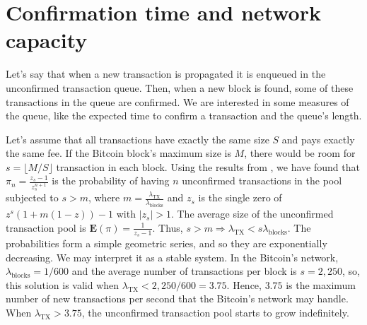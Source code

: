 


\section{Confirmation time and network capacity}

Let's say that when a new transaction is propagated it is enqueued in the unconfirmed transaction queue. Then, when a new block is found, some of these transactions in the queue are confirmed. We are interested in some measures of the queue, like the expected time to confirm a transaction and the queue's length.

Let's assume that all transactions have exactly the same size $S$ and pays exactly the same fee. If the Bitcoin block's maximum size is $M$, there would be room for $s = \lfloor M/S \rfloor$ transaction in each block. Using the results from \citet{bailey1954queueing}, we have found that $\pi_n = \frac{z_s-1}{z_s^{n+1}}$ is the probability of having $n$ unconfirmed transactions in the pool subjected to $s > m$, where $m=\frac{\lambda_{\text{TX}}}{\lambda_{\text{blocks}}}$ and $z_s$ is the single zero of $z^s(1+m(1-z))-1$ with $|z_s|>1$. The average size of the unconfirmed transaction pool is $\mathbf{E}(\pi) = \frac{1}{z_s - 1}$. Thus, $s > m \Rightarrow \lambda_{\text{TX}} < s \lambda_{\text{blocks}}$. The probabilities form a simple geometric series, and so they are exponentially decreasing. We may interpret it as a stable system. In the Bitcoin's network, $\lambda_{\text{blocks}} = 1/600$ and the average number of transactions per block is $s=2,250$, so, this solution is valid when $\lambda_{\text{TX}} < 2,250/600 = 3.75$. Hence, $3.75$ is the maximum number of new transactions per second that the Bitcoin's network may handle. When $\lambda_{\text{TX}} > 3.75$, the unconfirmed transaction pool starts to grow indefinitely.

